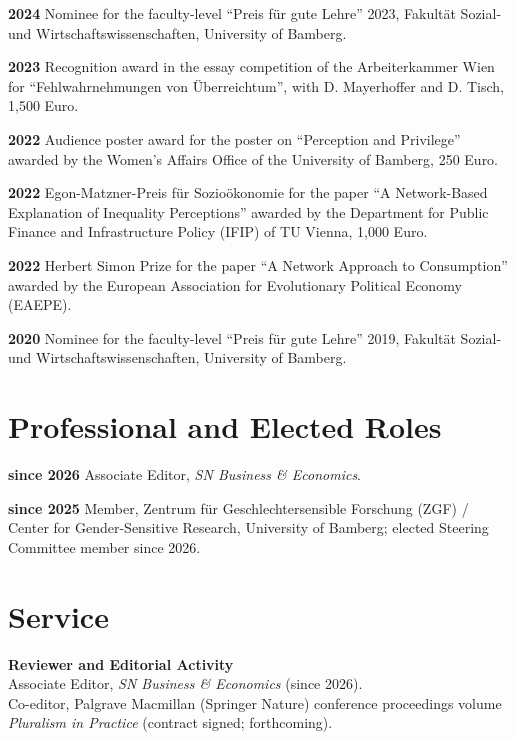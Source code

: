 \documentclass[margin]{res}
\begin{document}
\begin{resume}
	\textbf{2024} Nominee for the faculty-level ``Preis f\"ur gute Lehre'' 2023, Fakult\"at Sozial- und Wirtschaftswissenschaften, University of Bamberg.
	
	\textbf{2023} Recognition award in the essay competition of the Arbeiterkammer Wien for ``Fehlwahrnehmungen von \"Uberreichtum'', with D. Mayerhoffer and D. Tisch, 1,500 Euro.
	
	\textbf{2022} Audience poster award for the poster on ``Perception and Privilege'' awarded by the Women's Affairs Office of the University of Bamberg, 250 Euro.
	
	\textbf{2022} Egon-Matzner-Preis f\"ur Sozio\"okonomie for the paper ``A Network-Based Explanation of Inequality Perceptions'' awarded by the Department for Public Finance and Infrastructure Policy (IFIP) of TU Vienna, 1,000 Euro.
	
	\textbf{2022} Herbert Simon Prize for the paper ``A Network Approach to Consumption'' awarded by the European Association for Evolutionary Political Economy (EAEPE).
	
	\textbf{2020} Nominee for the faculty-level ``Preis f\"ur gute Lehre'' 2019, Fakult\"at Sozial- und Wirtschaftswissenschaften, University of Bamberg.
	
	\section{Professional and Elected Roles}
	\textbf{since 2026} Associate Editor, \textit{SN Business \& Economics}.
	
	\textbf{since 2025} Member, Zentrum f\"ur Geschlechtersensible Forschung (ZGF) / Center for Gender-Sensitive Research, University of Bamberg; elected Steering Committee member since 2026.
	
	\section{Service} 
	
	\textbf{Reviewer and Editorial Activity}\\
	Associate Editor, \textit{SN Business \& Economics} (since 2026).\\
	
	Co-editor, Palgrave Macmillan (Springer Nature) conference proceedings volume \textit{Pluralism in Practice} (contract signed; forthcoming).\\
	

\end{resume}
\end{document}
